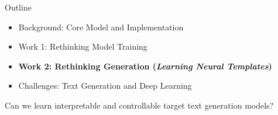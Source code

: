 
\begin{frame}{ Outline}
  \begin{itemize}
  \item Background: Core Model and Implementation
    \air
  \item Work 1: Rethinking Model Training 
    \air

  \item \textbf{Work 2: Rethinking  Generation  (\textit{Learning Neural Templates})}
    \air

  \item Challenges: Text Generation and Deep Learning
  \end{itemize}

  \begin{center}
    Can we learn interpretable and controllable target text generation models?
  \end{center}


\end{frame}







